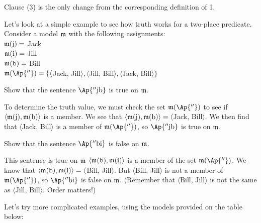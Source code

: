\noindent{}Clause (3) is the only change from the corresponding definition of \GQL{}1.

Let's look at a simple example to see how \GQL{} truth works for a two-place predicate.  Consider a model $\mathfrak{m}$ with the following assignments:\\

\noindent{}$\mathfrak{m}(\mathrm{j})=$ Jack\\
\noindent{}$\mathfrak{m}(\mathrm{i})=$ Jill\\
\noindent{}$\mathfrak{m}(\mathrm{b})=$ Bill\\
\noindent{}$\IntA(\Ap{''})=\{\langle$Jack, Jill$\rangle, \langle$Jill, Bill$\rangle, \langle$Jack, Bill$\rangle\}$\\

\begin{majorILnc}{}
Show that the sentence $\Ap{''\constant{j}\constant{b}}$ is true on $\mathfrak{m}$.
\end{majorILnc}
\begin{PROOF}
	To determine the truth value, we must check the set $\IntA(\Ap{''})$ to see if $\langle\mathfrak{m}(\mathrm{j}),\mathfrak{m}(\mathrm{b})\rangle$ is a member. 
	We see that $\langle\mathfrak{m}(\mathrm{j}),\mathfrak{m}(\mathrm{b})\rangle=\langle$Jack, Bill$\rangle$. 
	We then find that $\langle$Jack, Bill$\rangle$ is a member of $\IntA(\Ap{''})$, so $\Ap{''\constant{j}\constant{b}}$ is true on $\mathfrak{m}$.
\end{PROOF}

\begin{majorILnc}{}
Show that the sentence $\Ap{''\constant{b}\constant{i}}$ is false on $\mathfrak{m}$.
\end{majorILnc}
\begin{PROOF}
	This sentence is true on $\mathfrak{m}$ \Iff $\langle\mathfrak{m}(\mathrm{b}),\mathfrak{m}(\mathrm{i})\rangle$ is a member of the set $\IntA(\Ap{''})$. 
	We know that $\langle\mathfrak{m}(\mathrm{b}),\mathfrak{m}(\mathrm{i})\rangle=\langle$Bill, Jill$\rangle$. 
	But $\langle$Bill, Jill$\rangle$ is not a member of $\IntA(\Ap{''})$, so $\Ap{''\constant{b}\constant{i}}$ is false on $\mathfrak{m}$. 
	(Remember that $\langle$Bill, Jill$\rangle$ is not the same as $\langle$Jill, Bill$\rangle$.  Order matters!)
\end{PROOF}

Let's try more complicated examples, using the models provided on the table below:

